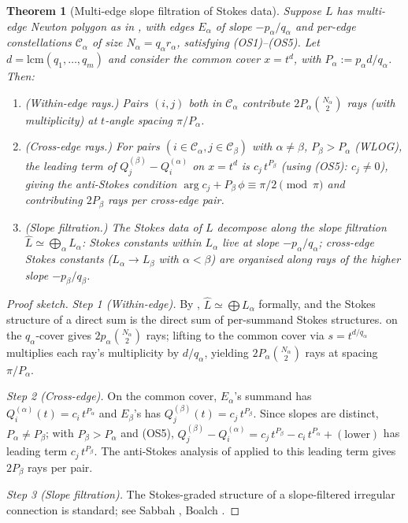 \documentclass[11pt,a4paper]{article}
\theoremstyle{plain}
\newtheorem{theorem}{Theorem}[section]
\theoremstyle{definition}
\theoremstyle{remark}
\newcommand{\Cl}{\mathcal{C}}
\DeclareMathOperator{\arginline}{arg}
\begin{document}
\begin{theorem}[Multi-edge slope filtration of Stokes data]\label{thm:AT5}
Suppose $L$ has multi-edge Newton polygon as in , with edges
$E_\alpha$ of slope $-p_\alpha / q_\alpha$ and per-edge constellations
$\Cl_\alpha$ of size $N_\alpha = q_\alpha r_\alpha$, satisfying (OS1)--(OS5).
Let $d = \mathrm{lcm}(q_1, \dots, q_m)$ and consider the common cover
$x = t^d$, with $P_\alpha := p_\alpha d / q_\alpha$. Then:
\begin{enumerate}[leftmargin=2em]
\item (Within-edge rays.) Pairs $(i, j)$ both in $\Cl_\alpha$ contribute
      $2 P_\alpha \binom{N_\alpha}{2}$ rays (with multiplicity) at
      $t$-angle spacing $\pi / P_\alpha$.
\item (Cross-edge rays.) For pairs $(i \in \Cl_\alpha, j \in \Cl_\beta)$
      with $\alpha \ne \beta$, $P_\beta > P_\alpha$ (WLOG), the leading
      term of $Q_j^{(\beta)} - Q_i^{(\alpha)}$ on $x = t^d$ is $c_j\,
      t^{P_\beta}$ (using (OS5): $c_j \ne 0$), giving the anti-Stokes
      condition $\arginline c_j + P_\beta\, \phi \equiv \pi/2 \pmod{\pi}$
      and contributing $2 P_\beta$ rays per cross-edge pair.
\item (Slope filtration.) The Stokes data of $L$ decompose along the
      slope filtration $\widehat{L} \simeq \bigoplus_\alpha L_\alpha$:
      Stokes constants within $L_\alpha$ live at slope $-p_\alpha /
      q_\alpha$; cross-edge Stokes constants ($L_\alpha \to L_\beta$ with
      $\alpha < \beta$) are organised along rays of the \emph{higher}
      slope $-p_\beta / q_\beta$.
\end{enumerate}
\end{theorem}

\begin{proof}[Proof sketch]
\textit{Step 1 (Within-edge).} By , $\widehat{L} \simeq
\bigoplus L_\alpha$ formally, and the Stokes structure of a direct sum is
the direct sum of per-summand Stokes structures.  on the
$q_\alpha$-cover gives $2 p_\alpha \binom{N_\alpha}{2}$ rays; lifting to
the common cover via $s = t^{d/q_\alpha}$ multiplies each ray's
multiplicity by $d / q_\alpha$, yielding $2 P_\alpha \binom{N_\alpha}{2}$
rays at spacing $\pi / P_\alpha$.

\textit{Step 2 (Cross-edge).} On the common cover, $E_\alpha$'s summand
has $Q_i^{(\alpha)}(t) = c_i\, t^{P_\alpha}$ and $E_\beta$'s has
$Q_j^{(\beta)}(t) = c_j\, t^{P_\beta}$. Since slopes are distinct,
$P_\alpha \ne P_\beta$; with $P_\beta > P_\alpha$ and (OS5),
$Q_j^{(\beta)} - Q_i^{(\alpha)} = c_j\, t^{P_\beta} - c_i\, t^{P_\alpha}
+ (\text{lower})$ has leading term $c_j\, t^{P_\beta}$. The anti-Stokes
analysis of  applied to this leading term gives $2 P_\beta$
rays per pair.

\textit{Step 3 (Slope filtration).} The Stokes-graded structure of a
slope-filtered irregular connection is standard; see Sabbah
\cite[\S 11]{sabbah-polarizable}, Boalch \cite[\S 3]{boalch-wildhodge}.
\end{proof}
\end{document}
